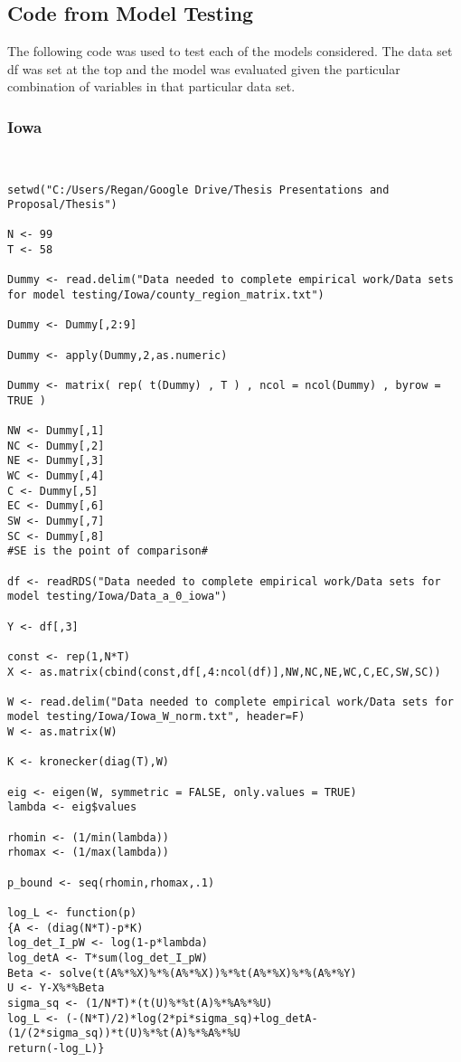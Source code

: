\subsection{Code from Model Testing}

The following code was used to test each of the models considered. The data set df was set at the top and the model was evaluated given the particular combination of variables in that particular data set.

\subsubsection{Iowa}

\begin{lstlisting}


setwd("C:/Users/Regan/Google Drive/Thesis Presentations and Proposal/Thesis")

N <- 99
T <- 58

Dummy <- read.delim("Data needed to complete empirical work/Data sets for model testing/Iowa/county_region_matrix.txt")

Dummy <- Dummy[,2:9]

Dummy <- apply(Dummy,2,as.numeric)

Dummy <- matrix( rep( t(Dummy) , T ) , ncol = ncol(Dummy) , byrow = TRUE )

NW <- Dummy[,1]
NC <- Dummy[,2]
NE <- Dummy[,3]
WC <- Dummy[,4]
C <- Dummy[,5]
EC <- Dummy[,6]
SW <- Dummy[,7]
SC <- Dummy[,8]
#SE is the point of comparison#

df <- readRDS("Data needed to complete empirical work/Data sets for model testing/Iowa/Data_a_0_iowa")

Y <- df[,3]

const <- rep(1,N*T)
X <- as.matrix(cbind(const,df[,4:ncol(df)],NW,NC,NE,WC,C,EC,SW,SC))

W <- read.delim("Data needed to complete empirical work/Data sets for model testing/Iowa/Iowa_W_norm.txt", header=F)
W <- as.matrix(W)

K <- kronecker(diag(T),W)

eig <- eigen(W, symmetric = FALSE, only.values = TRUE)
lambda <- eig$values

rhomin <- (1/min(lambda))
rhomax <- (1/max(lambda))

p_bound <- seq(rhomin,rhomax,.1)

log_L <- function(p)
{A <- (diag(N*T)-p*K)
log_det_I_pW <- log(1-p*lambda)
log_detA <- T*sum(log_det_I_pW)
Beta <- solve(t(A%*%X)%*%(A%*%X))%*%t(A%*%X)%*%(A%*%Y)
U <- Y-X%*%Beta
sigma_sq <- (1/N*T)*(t(U)%*%t(A)%*%A%*%U)
log_L <- (-(N*T)/2)*log(2*pi*sigma_sq)+log_detA-(1/(2*sigma_sq))*t(U)%*%t(A)%*%A%*%U
return(-log_L)}


\end{lstlisting}
